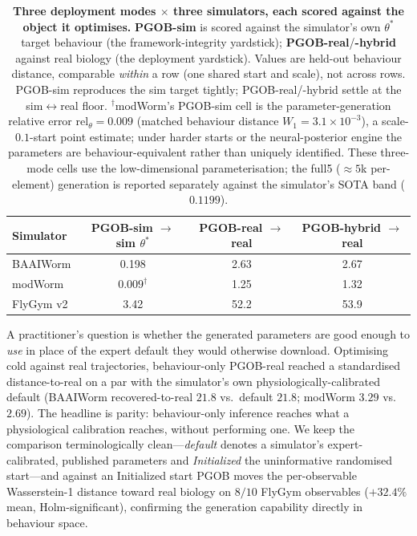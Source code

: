 \documentclass[11pt]{article}
\begin{document}
\begin{table}[h]
\centering\small
\caption{\textbf{Three deployment modes $\times$ three simulators, each scored against the object it optimises.} \textbf{PGOB-sim} is scored against the simulator's own $\theta^{*}$ target behaviour (the framework-integrity yardstick); \textbf{PGOB-real}/\textbf{-hybrid} against real biology (the deployment yardstick). Values are held-out behaviour distance, comparable \emph{within} a row (one shared start and scale), not across rows. PGOB-sim reproduces the sim target tightly; PGOB-real/-hybrid settle at the sim$\leftrightarrow$real floor. $^{\dagger}$modWorm's PGOB-sim cell is the parameter-generation relative error $\mathrm{rel}_\theta{=}0.009$ (matched behaviour distance $W_1{=}3.1\times10^{-3}$), a scale-$0.1$-start point estimate; under harder starts or the neural-posterior engine the parameters are behaviour-equivalent rather than uniquely identified. These three-mode cells use the low-dimensional parameterisation; the full5 ($\approx5$k per-element) generation is reported separately against the simulator's SOTA band ($0.1199$).}
\label{tab:modes_v8}
\begin{tabular}{lccc}\toprule
Simulator & PGOB-sim $\to$ sim $\theta^{*}$ & PGOB-real $\to$ real & PGOB-hybrid $\to$ real \\\midrule
BAAIWorm   & 0.198 & 2.63 & 2.67 \\
modWorm    & $0.009^{\dagger}$ & 1.25 & 1.32 \\
FlyGym v2  & 3.42  & 52.2 & 53.9 \\\bottomrule
\end{tabular}
\end{table}

A practitioner's question is whether the generated parameters are good enough to \emph{use} in place of the expert default they would otherwise download. Optimising cold against real trajectories, behaviour-only PGOB-real reached a standardised distance-to-real on a par with the simulator's own physiologically-calibrated default (BAAIWorm recovered-to-real $21.8$ vs.\ default $21.8$; modWorm $3.29$ vs.\ $2.69$). The headline is parity: behaviour-only inference reaches what a physiological calibration reaches, without performing one. We keep the comparison terminologically clean---\emph{default} denotes a simulator's expert-calibrated, published parameters and \emph{Initialized} the uninformative randomised start---and against an Initialized start PGOB moves the per-observable Wasserstein-1 distance toward real biology on $8/10$ FlyGym observables ($+32.4\%$ mean, Holm-significant), confirming the generation capability directly in behaviour space.
\end{document}
